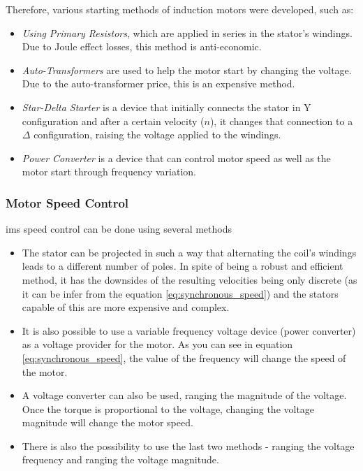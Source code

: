 Therefore, various starting methods of induction motors were developed, such as:

\begin{itemize}
  \item 
  \emph{Using Primary Resistors}, which are applied in series in the stator's windings. Due to Joule effect losses, this method is anti-economic.
  \item 
  \emph{Auto-Transformers} are used to help the motor start by changing the voltage. Due to the auto-transformer price, this is an expensive method.
  \item 
  \emph{Star-Delta Starter} is a device that initially connects the stator in Y configuration and after a certain velocity ($n$), it changes that connection to a $\Delta$ configuration, raising the voltage applied to the windings.
  \item 
  \emph{Power Converter} is a device that can control motor speed as well as the motor start through frequency variation.
\end{itemize}

\subsubsection{Motor Speed Control}
\acrshort{ims} speed control can be done using several methods

\begin{itemize}
  \item 
  The stator can be projected in such a way that alternating the coil's windings leads to a different number of poles. In spite of being a robust and efficient method, it has the downsides of the resulting velocities being only discrete (as it can be infer from the equation \ref{eq:synchronous_speed}) and the stators capable of this are more expensive and complex. 
  \item 
  It is also possible to use a variable frequency voltage device (power converter) as a voltage provider for the motor. As you can see in equation \ref{eq:synchronous_speed}, the value of the frequency will change the speed of the motor.
  \item 
  A voltage converter can also be used, ranging the magnitude of the voltage. Once the torque is proportional to the voltage, changing the voltage magnitude will change the motor speed.
  \item 
  There is also the possibility to use the last two methods - ranging the voltage frequency and ranging the voltage magnitude.
\end{itemize}

